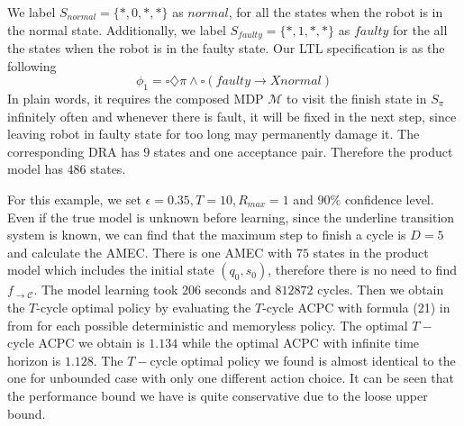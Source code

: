 \documentclass[journal]{IEEEtran}
\begin{document}
We label $S_{normal}=\{*,0,*,*\}$ as $normal$, for all the states when the robot is in the normal state. Additionally, we label  $S_{faulty}=\{*,1,*,*\}$  as $faulty$ for the all the states when the robot is in the faulty state. Our LTL specification is as the following
\begin{equation}\label{eqn:LTL1}
	\phi_1=\square\diamondsuit\pi\wedge  \square (faulty \rightarrow  X normal)
\end{equation}
In plain words, it requires the composed MDP $\mathcal{M}$ to visit the finish state in $S_\pi$ infinitely often and whenever there is fault, it will be fixed in the next step, since leaving robot in faulty state for too long may permanently damage it. The corresponding DRA has $9$ states and one acceptance pair. Therefore the product model has $486$ states.

For this example, we set $\epsilon=0.35,T=10, R_{max}=1$ and $90\%$ confidence level. Even if the true model is unknown before learning, since the underline transition system is known, we can find that the maximum step to finish a cycle is $D=5$ and calculate the AMEC. There is one AMEC with $75$ states in the product model which includes the initial state $(q_0,s_0)$, therefore there is no need to find $f_{\rightarrow\mathcal{C}}$. The model learning took  $206$ seconds and $812872$ cycles. Then we obtain the $T$-cycle optimal policy by evaluating the $T$-cycle ACPC with formula (21) in from \cite{ding2014optimal} for each possible deterministic and memoryless policy. The optimal $T-$cycle ACPC we obtain is $1.134$ while the optimal ACPC with infinite time horizon is $1.128$. The $T-$cycle optimal policy we found is almost identical to the one for unbounded case with only one different action choice. It can be seen that the performance bound we have is quite conservative due to the loose upper bound.
\end{document}
